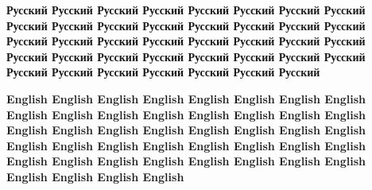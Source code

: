 \thispagestyle{plain}
\begin{center}
    \Large
\end{center}
  

	\large
	\justifying
	\vspace{0.5cm}
	
	\vspace{0.5cm}
	\textbf{Русский Русский Русский Русский Русский Русский Русский Русский Русский Русский Русский Русский Русский Русский Русский Русский Русский Русский Русский Русский Русский Русский Русский Русский Русский Русский Русский Русский Русский Русский Русский Русский Русский Русский Русский Русский Русский Русский Русский }
	
	\vspace{0.5cm}
	\textbf{ English English English English English English English English English English English English English English English English English English English English English English English English English English English English English English English English English English English English English English English English English English English English}

    
    



